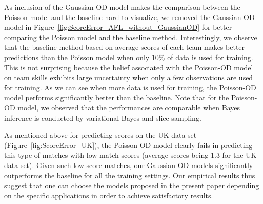 \begin{center}
\begin{figure*}[htbp!]
 \centering
\caption{\small Results on the AFL data set, evaluated using win/loss prediction accuracy in
term of the area of the curve (AUC). Error bars indicate
standard errors.}
\label{fig:ScoreError_AFL}
\end{figure*}
\end{center}

As inclusion of the Gaussian-OD model makes the comparison between the Poisson model and the baseline hard to visualize, we removed the Gaussian-OD model in Figure~\ref{fig:ScoreError_AFL_without_GaussianOD} for better comparing the Poisson model and the baseline method. Interestingly, we observe that the baseline method based on average scores of each team makes better predictions than the Poisson model when only 10\% of data is used for training. This is not surprising because the belief associated with the Poisson-OD model on team skills exhibits large uncertainty when only a few observations are used for training. As we can see when more data is used for training, the Poisson-OD model performs significantly better than the baseline. Note that for the Poisson-OD model, we observed that the performances are comparable when Bayes inference is conducted by variational Bayes and slice sampling.
 
\begin{center}
\begin{figure*}[htbp!]
 \centering
\caption{\small Results on the AFL data set, evaluated using win/loss prediction accuracy in
term of the area of the curve (AUC). Error bars indicate
standard errors.}
\label{fig:ScoreError_AFL_without_GaussianOD}
\end{figure*}
\end{center}

As mentioned above for predicting scores on the UK data set (Figure~\ref{fig:ScoreError_UK}), the Poisson-OD model clearly fails in predicting this type of matches with low match scores (average scores being 1.3 for the UK data set). Given such low score matches, our Gaussian-OD models significantly outperforms the baseline for all the training settings. Our empirical results thus suggest that one can choose the models proposed in the present paper depending on the specific applications in order to achieve satisfactory results. 
\begin{center}
\begin{figure*}[t!]
 \centering
\caption{\small Results on the UK-PL, evaluated using score
prediction error (right column). Error bars indicate
standard errors.}
\label{fig:ScoreError_UK}
\end{figure*}
\end{center}

